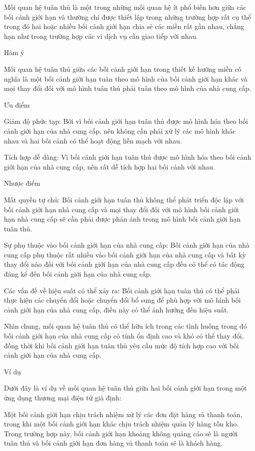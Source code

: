 Mối quan hệ tuân thủ là một trong những mối quan hệ ít phổ biến hơn giữa các bối cảnh giới hạn và thường chỉ được thiết lập trong những trường hợp rất cụ thể trong đó hai hoặc nhiều bối cảnh giới hạn chia sẻ các miền rất gần nhau, chẳng hạn như trong trường hợp các vi dịch vụ cần giao tiếp với nhau.

Hàm ý

Mối quan hệ tuân thủ giữa các bối cảnh giới hạn trong thiết kế hướng miền có nghĩa là một bối cảnh giới hạn tuân theo mô hình của bối cảnh giới hạn khác và mọi thay đổi đối với mô hình tuân thủ phải tuân theo mô hình của nhà cung cấp.

Ưu điểm

Giảm độ phức tạp: Bởi vì bối cảnh giới hạn tuân thủ được mô hình hóa theo bối cảnh giới hạn của nhà cung cấp, nên không cần phải xử lý các mô hình khác nhau và hai bối cảnh có thể hoạt động liền mạch với nhau.

Tích hợp dễ dàng: Vì bối cảnh giới hạn tuân thủ được mô hình hóa theo bối cảnh giới hạn của nhà cung cấp, nên rất dễ tích hợp hai bối cảnh với nhau.

Nhược điểm

Mất quyền tự chủ: Bối cảnh giới hạn tuân thủ không thể phát triển độc lập với bối cảnh giới hạn nhà cung cấp và mọi thay đổi đối với mô hình bối cảnh giới hạn nhà cung cấp sẽ cần phải được phản ánh trong mô hình bối cảnh giới hạn tuân thủ.

Sự phụ thuộc vào bối cảnh giới hạn của nhà cung cấp: Bối cảnh giới hạn của nhà cung cấp phụ thuộc rất nhiều vào bối cảnh giới hạn của nhà cung cấp và bất kỳ thay đổi nào đối với bối cảnh giới hạn của nhà cung cấp đều có thể có tác động đáng kể đến bối cảnh giới hạn của nhà cung cấp.

Các vấn đề về hiệu suất có thể xảy ra: Bối cảnh giới hạn tuân thủ có thể phải thực hiện các chuyển đổi hoặc chuyển đổi bổ sung để phù hợp với mô hình bối cảnh giới hạn của nhà cung cấp, điều này có thể ảnh hưởng đến hiệu suất.

Nhìn chung, mối quan hệ tuân thủ có thể hữu ích trong các tình huống trong đó bối cảnh giới hạn của nhà cung cấp có tính ổn định cao và khó có thể thay đổi, đồng thời khi bối cảnh giới hạn tuân thủ yêu cầu mức độ tích hợp cao với bối cảnh giới hạn của nhà cung cấp.

Ví dụ

Dưới đây là ví dụ về mối quan hệ tuân thủ giữa hai bối cảnh giới hạn trong một ứng dụng thương mại điện tử giả định:

Một bối cảnh giới hạn chịu trách nhiệm xử lý các đơn đặt hàng và thanh toán, trong khi một bối cảnh giới hạn khác chịu trách nhiệm quản lý hàng tồn kho. Trong trường hợp này, bối cảnh giới hạn khoảng không quảng cáo sẽ là người tuân thủ và bối cảnh giới hạn đơn hàng và thanh toán sẽ là khách hàng.


